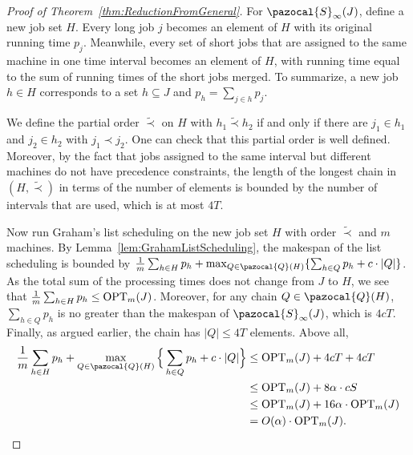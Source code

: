 \begin{proof}[Proof of Theorem~\ref{thm:ReductionFromGeneral}]
  For $\pazocal{S}_{\infty}(J)$, define a new job set $H$. 
  Every long job $j$ becomes an element of $H$ with its original running time $p_j$. 
  Meanwhile, every set of short jobs that are assigned to the same machine in one time interval becomes an element of $H$, 
  with running time equal to the sum of running times of the short jobs merged. 
  To summarize, a new job $h \in H$ corresponds to a set $h \subseteq J$ and $p_h = \sum_{j\in h} p_j$.
	
  We define the partial order $\tilde{\prec}$ on $H$ with $h_1 \tilde{\prec} h_2$ if and only if there are
  $j_1 \in h_1$ and $j_2 \in h_2$ with $j_1 \prec j_2$. 
One can check that this partial order is well defined. 
  Moreover, by the fact that jobs assigned to the same interval but different machines do not have precedence constraints, 
  the length of the longest chain in $(H,\tilde{\prec})$ in terms of the number of elements is bounded by the number of intervals that are used, 
  which is at most $4T$.
	
  Now run Graham's list scheduling on the new job set $H$ with order $\tilde{\prec}$ and $m$ machines. 
  By Lemma~\ref{lem:GrahamListScheduling}, the makespan of the list scheduling is bounded by  
  $\frac{1}{m} \sum_{h\in H}p_h+\max_{Q \in \pazocal{Q}(H)}\{\sum_{h \in Q}p_h+ c\cdot |Q| \}$.
  As the total sum of the processing times does not change from $J$ to $H$, we see that
  $\frac{1}{m} \sum_{h\in H}p_h \leq \textnormal{OPT}_m(J)$. 
  Moreover, for any chain $Q \in \pazocal{Q}(H)$, $\sum_{h \in Q}p_h$ is no greater than the makespan of $\pazocal{S}_{\infty}(J)$, which is $4cT$.
	Finally, as argued earlier, the chain has $|Q| \leq 4T$ elements.
	Above all, 
  \begin{align*}
    \frac{1}{m} \sum_{h\in H}p_h+\max_{Q \in \pazocal{Q}(H)}\Big\{\sum_{h \in Q}p_h+c\cdot|Q| \Big\} &\le
          \textnormal{OPT}_m(J)+4cT+4cT \\
  &\le \textnormal{OPT}_m(J)+ 8\alpha \cdot cS \\
    &\le \textnormal{OPT}_m(J)+  16\alpha \cdot \textnormal{OPT}_{m}(J) \\
    &=O(\alpha)\cdot \textnormal{OPT}_{m}(J).
	\end{align*}
\end{proof}



